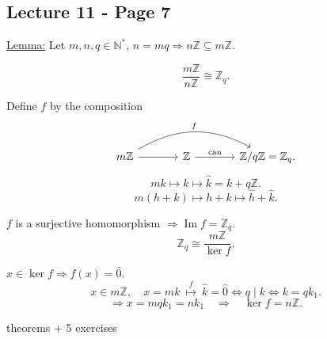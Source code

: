 
\subsection*{Lecture 11 - Page 7}

\noindent\underline{Lemma:} Let $m,n,q\in\mathbb N^*$, $n=mq\Rightarrow n\mathbb Z\subseteq m\mathbb Z$.

\[
\frac{m\mathbb Z}{n\mathbb Z}\cong\mathbb Z_q.
\]

\noindent Define $f$ by the composition
\[
\begin{tikzcd}[column sep=large]
m\mathbb Z \arrow[r] \arrow[rr,bend left=30,"f"] &
\mathbb Z \arrow[r,"\mathrm{can}"] &
\mathbb Z/q\mathbb Z=\mathbb Z_q .
\end{tikzcd}
\]
\[
mk\longmapsto k\longmapsto \widehat{k}=k+q\mathbb Z.
\]
\[
m(h+k)\longmapsto h+k\longmapsto\widehat h+\widehat k.
\]

\noindent $f$ is a surjective homomorphism $\Rightarrow \operatorname{Im}f=\mathbb Z_q$.
\[
\mathbb Z_q\cong \frac{m\mathbb Z}{\ker f}.
\]

\noindent $x\in\ker f\Rightarrow f(x)=\widehat 0$.
\[
x\in m\mathbb Z,\quad x=mk\ \stackrel{f}{\longmapsto}\ \widehat k=\widehat 0
\iff q\mid k\iff k=qk_1.
\]
\[
\Rightarrow x=mqk_1=nk_1\quad\Rightarrow\quad\ker f=n\mathbb Z.
\]

\bigskip
\begin{center}
 theorems + 5 exercises
\end{center}

